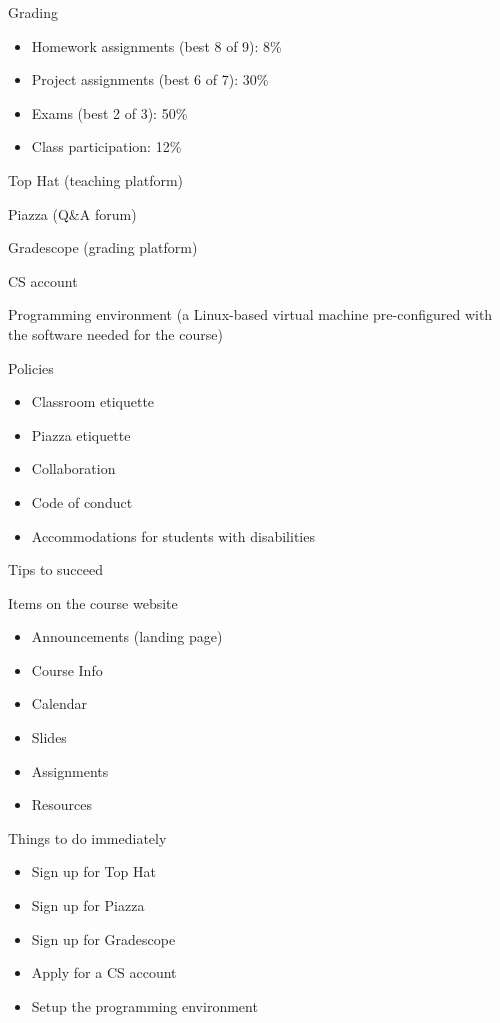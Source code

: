 \documentclass[8pt,a4paper,compress]{beamer}
\begin{document}
\begin{frame}[fragile]
\pause

Grading
\begin{itemize}
\item Homework assignments (best 8 of 9): 8\%
\item Project assignments (best 6 of 7): 30\%
\item Exams (best 2 of 3): 50\%
\item Class participation: 12\%
\end{itemize}

\pause
\bigskip

Top Hat (teaching platform)

\pause
\bigskip

Piazza (Q\&A forum)

\pause
\bigskip

Gradescope (grading platform)

\pause
\bigskip

CS account

\pause
\bigskip

Programming environment (a Linux-based virtual machine pre-configured with the software needed for the course)

\pause
\bigskip

Policies
\begin{itemize}
\item Classroom etiquette
\item Piazza etiquette
\item Collaboration
\item Code of conduct
\item Accommodations for students with disabilities
\end{itemize}
\end{frame}

\begin{frame}[fragile]
\pause

Tips to succeed

\pause
\bigskip

Items on the course website
\begin{itemize}
\item Announcements (landing page)
\item Course Info
\item Calendar
\item Slides 
\item Assignments
\item Resources
\end{itemize}

\pause
\bigskip

Things to do immediately
\begin{itemize}
\item Sign up for Top Hat
\item Sign up for Piazza
\item Sign up for Gradescope
\item Apply for a CS account
\item Setup the programming environment
\end{itemize}
\end{frame}
\end{document}

